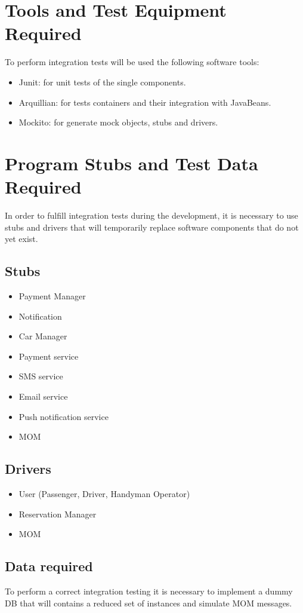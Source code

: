 \documentclass{article}
\begin{document}
	\section{Tools and Test Equipment Required}
	To perform integration tests will be used the following software tools:
	\begin{itemize}
		\item Junit: for unit tests of the single components.
		\item Arquillian: for tests containers and their integration with JavaBeans.
		\item Mockito: for generate mock objects, stubs and drivers.
	\end{itemize}
	\section{Program Stubs and Test Data Required}
	In order to fulfill integration tests during the development, it is necessary to use stubs and drivers that will temporarily replace software components that do not yet exist.
		\subsection{Stubs}
			\begin{itemize}
				\item Payment Manager
				\item Notification
				\item Car Manager
				\item Payment service
				\item SMS service
				\item Email service
				\item Push notification service
				\item MOM
			\end{itemize}
		\subsection{Drivers}
			\begin{itemize}
				\item User (Passenger, Driver, Handyman Operator)
				\item Reservation Manager
				\item MOM
			\end{itemize}
		\subsection{Data required}
		To perform a correct integration testing it is necessary to implement a dummy DB that will contains a reduced set of instances and simulate MOM messages.
	\pagebreak
\end{document}
